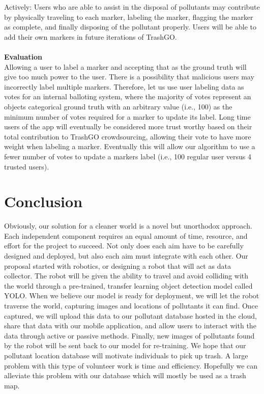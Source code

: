\documentclass[
  journal=small,
  manuscript=article-type,  %
  year=2022,
  volume=1,
]{cup-journal}
\begin{document}
Actively: Users who are able to assist in the disposal of pollutants may contribute by physically traveling to each marker, labeling the marker, flagging the marker as complete, and finally disposing of the pollutant properly. Users will be able to add their own markers in future iterations of TrashGO.
\\\\\textbf{Evaluation}\\
Allowing a user to label a marker and accepting that as the ground truth will give too much power to the user. There is a possibility that malicious users may incorrectly label multiple markers. Therefore, let us use user labeling data as votes for an internal balloting system, where the majority of votes represent an objects categorical ground truth with an arbitrary value (i.e., 100) as the minimum number of votes required for a marker to update its label. Long time users of the app will eventually be considered more trust worthy based on their total contribution to TrashGO crowdsourcing, allowing their vote to have more weight when labeling a marker. Eventually this will allow our algorithm to use a fewer number of votes to update a markers label (i.e., 100 regular user versus 4 trusted users).

\section{Conclusion}
Obviously, our solution for a cleaner world is a novel but unorthodox approach. Each independent component requires an equal amount of time, resource, and effort for the project to succeed. Not only does each aim have to be carefully designed and deployed, but also each aim must integrate with each other. Our proposal started with robotics, or designing a robot that will act as data collector. The robot will be given the ability to travel and avoid colliding with the world through a pre-trained, transfer learning object detection model called YOLO. When we believe our model is ready for deployment, we will let the robot traverse the world, capturing images and locations of pollutants it can find. Once captured, we will upload this data to our pollutant database hosted in the cloud, share that data with our mobile application, and allow users to interact with the data through active or passive methods. Finally, new images of pollutants found by the robot will be sent back to our model for re-training. We hope that our pollutant location database will motivate individuals to pick up trash. A large problem with this type of volunteer work is time and efficiency. Hopefully we can alleviate this problem with our database which will mostly be used as a trash map. 
\end{document}
